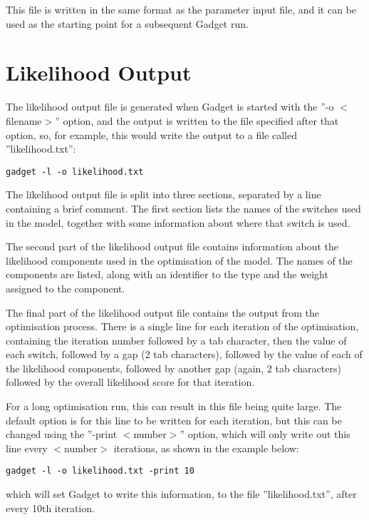 \documentclass[10pt,twoside]{book}
\begin{document}
\bigskip
This file is written in the same format as the parameter input file, and it can be used as the starting point for a subsequent Gadget run.

\section{Likelihood Output}\label{sec:likelihoodoutput}
The likelihood output file is generated when Gadget is started with the ''-o $<$filename$>$'' option, and the output is written to the file specified after that option, so, for example, this would write the output to a file called ''likelihood.txt'':

{\small\begin{verbatim}
gadget -l -o likelihood.txt
\end{verbatim}}

The likelihood output file is split into three sections, separated by a line containing a brief comment.  The first section lists the names of the switches used in the model, together with some information about where that switch is used.

\bigskip
The second part of the likelihood output file contains information about the likelihood components used in the optimisation of the model.  The names of the components are listed, along with an identifier to the type and the weight assigned to the component.

\bigskip
The final part of the likelihood output file contains the output from the optimisation process.  There is a single line for each iteration of the optimisation, containing the iteration number followed by a tab character, then the value of each switch, followed by a gap (2 tab characters), followed by the value of each of the likelihood components, followed by another gap (again, 2 tab characters) followed by the overall likelihood score for that iteration.

\bigskip
For a long optimisation run, this can result in this file being quite large.  The default option is for this line to be written for each iteration, but this can be changed using the ''-print $<$number$>$'' option, which will only write out this line every $<$number$>$ iterations, as shown in the example below:

{\small\begin{verbatim}
gadget -l -o likelihood.txt -print 10
\end{verbatim}}

which will set Gadget to write this information, to the file ''likelihood.txt'', after every 10th iteration.
\end{document}
